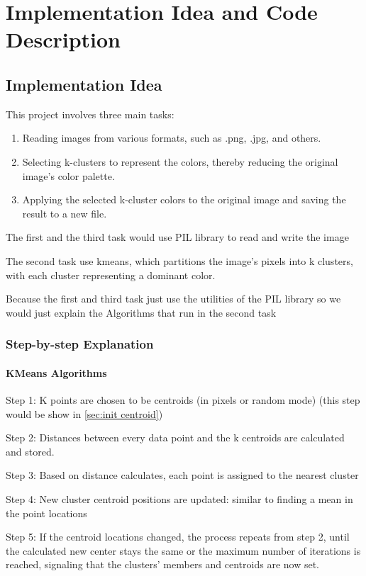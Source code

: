 \section{Implementation Idea and Code Description}
\subsection{Implementation Idea}
\qquad This project involves three main tasks:
\begin{enumerate}
    \item Reading images from various formats, such as .png, .jpg, and others.
    \item Selecting k-clusters to represent the colors, thereby reducing the original image's color palette.
    \item Applying the selected k-cluster colors to the original image and saving the result to a new file.
\end{enumerate}
\qquad The first and the third task would use PIL library to read and write the image

\qquad The second task use kmeans, which partitions the image's pixels into k clusters, with each cluster representing a dominant color.

\qquad \quad Because the first and third task just use the utilities of the PIL library so we would just explain the Algorithms that run in the second task

\subsubsection{Step-by-step Explanation}


\paragraph{KMeans Algorithms \cite{kmeansbrilliant}}
\quad

\qquad Step 1: K points are chosen to be centroids (in pixels or random mode) (this step would be show in \ref{sec:init centroid})

\qquad Step 2: Distances between every data point and the k centroids are calculated and stored.

\qquad Step 3: Based on distance calculates, each point is assigned to the nearest cluster

\qquad Step 4: New cluster centroid positions are updated: similar to finding a mean in the point locations

\qquad Step 5: If the centroid locations changed, the process repeats from step 2, until the calculated new center stays the same or the maximum number of iterations is reached, signaling that the clusters' members and centroids are now set.
